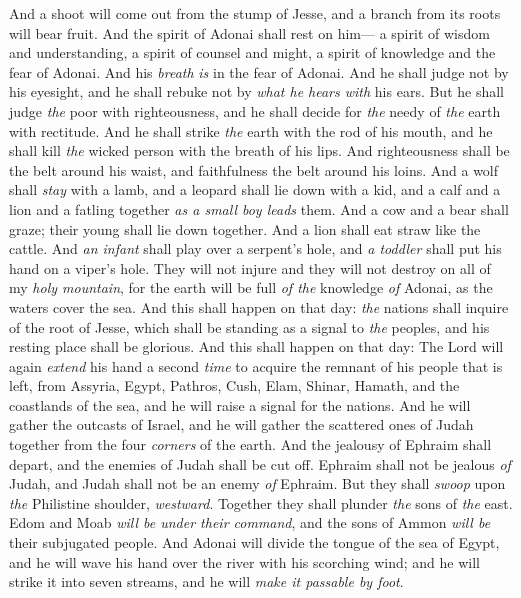 \begin{biblechapter} %
 And a shoot will come out from the stump of Jesse, 
and a branch from its roots will bear fruit.
\verse And the spirit of Adonai shall rest on him— 
a spirit of wisdom and understanding, 
a spirit of counsel and might, 
a spirit of knowledge and the fear of Adonai.
\verse And his \textit{breath} \textit{is} in the fear of Adonai. 
And he shall judge not by his eyesight, 
and he shall rebuke not by \textit{what he hears with} his ears.
\verse But he shall judge \textit{the} poor with righteousness, 
and he shall decide for \textit{the} needy of \textit{the} earth with rectitude. 
And he shall strike \textit{the} earth with the rod of his mouth, 
and he shall kill \textit{the} wicked person with the breath of his lips.
\verse And righteousness shall be the belt around his waist, 
and faithfulness the belt around his loins.
\verse And a wolf shall \textit{stay} with a lamb, 
and a leopard shall lie down with a kid, 
and a calf and a lion and a fatling together 
\textit{as a small boy leads} them.
\verse And a cow and a bear shall graze; 
their young shall lie down together. 
And a lion shall eat straw like the cattle.
\verse And \textit{an infant} shall play over a serpent’s hole, 
and \textit{a toddler} shall put his hand on a viper’s hole.
\verse They will not injure and they will not destroy on all of my \textit{holy mountain}, 
for the earth will be full \textit{of the} knowledge \textit{of} Adonai, 
as the waters cover the sea.
\verse And this shall happen on that day: \textit{the} nations shall inquire of the root of Jesse, 
which shall be standing as a signal to \textit{the} peoples, 
and his resting place shall be glorious.
 And this shall happen on that day:
\verse The Lord will again \textit{extend} his hand a second \textit{time} 
to acquire the remnant of his people that is left, 
from Assyria, Egypt, Pathros, Cush, Elam, Shinar, Hamath, and the coastlands of the sea,
\verse and he will raise a signal for the nations. 
And he will gather the outcasts of Israel, 
and he will gather the scattered ones of Judah together from the four \textit{corners} of the earth.
\verse And the jealousy of Ephraim shall depart, 
and the enemies of Judah shall be cut off. 
Ephraim shall not be jealous \textit{of} Judah, 
and Judah shall not be an enemy \textit{of} Ephraim.
\verse But they shall \textit{swoop} upon \textit{the} Philistine shoulder, \textit{westward}. 
Together they shall plunder \textit{the} sons of \textit{the} east. 
Edom and Moab \textit{will be under their command}, 
and the sons of Ammon \textit{will be} their subjugated people.
\verse And Adonai will divide the tongue of the sea of Egypt, 
and he will wave his hand over the river with his scorching wind; 
and he will strike it into seven streams, 
and he will \textit{make it passable by foot}.
\end{biblechapter}

